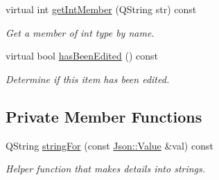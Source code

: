 \begin{DoxyCompactItemize}
virtual int \hyperlink{class_a_w_e_1_1_media_item_ac9dddb31a9dd9783e9c516e2717efde2}{get\-Int\-Member} (Q\-String str) const 
\begin{DoxyCompactList}\small\item\em Get a member of {\ttfamily int} type by name. \end{DoxyCompactList}\item 
virtual bool \hyperlink{class_a_w_e_1_1_media_item_aa804e6127c3a94a744a6757bf3ac98c7}{has\-Been\-Edited} () const 
\begin{DoxyCompactList}\small\item\em Determine if this item has been edited. \end{DoxyCompactList}\end{DoxyCompactItemize}
\subsection*{Private Member Functions}
\begin{DoxyCompactItemize}
\item 
Q\-String \hyperlink{class_a_w_e_1_1_media_item_a4592497d8dee990cf53da12b898bbf98}{string\-For} (const \hyperlink{class_json_1_1_value}{Json\-::\-Value} \&val) const 
\begin{DoxyCompactList}\small\item\em Helper function that makes details into strings. \end{DoxyCompactList}\end{DoxyCompactItemize}
